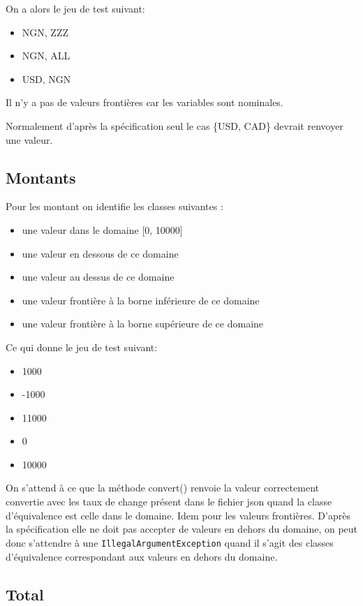 \documentclass[11pt]{rapport-tp-qlm}
\begin{document}
On a alors le jeu de test suivant:
\begin{itemize}
  \item NGN, ZZZ
  \item NGN, ALL
  \item USD, NGN
\end{itemize}

Il n'y a pas de valeurs frontières car les variables sont nominales.

Normalement d'après la spécification seul le cas \{USD, CAD\} devrait renvoyer une valeur.
\newpage
\subsection*{Montants}
Pour les montant on identifie les classes suivantes : 
\begin{itemize}
  \item une valeur dans le domaine [0, 10000]
  \item une valeur en dessous de ce domaine
  \item une valeur au dessus de ce domaine
  \item une valeur frontière à la borne inférieure de ce domaine
  \item une valeur frontière à la borne supérieure de ce domaine
\end{itemize}



Ce qui donne le jeu de test suivant:
\begin{itemize}
  \item 1000
  \item -1000
  \item 11000
  \item 0
  \item 10000
\end{itemize}

On s'attend à ce que la méthode convert() renvoie la valeur correctement convertie avec les taux de change présent dans le fichier json quand la classe d'équivalence est celle dans le domaine. Idem pour les valeurs frontières. D'après la spécification elle ne doit pas accepter de valeurs en dehors du domaine, on peut donc s'attendre à une \texttt{IllegalArgumentException} quand il s'agit des classes d'équivalence correspondant aux valeurs en dehors du domaine.

\subsection*{Total}
\end{document}
